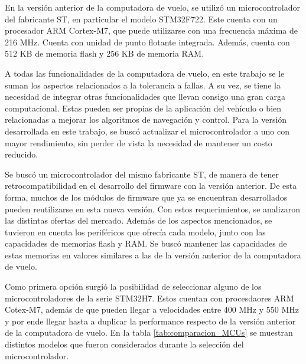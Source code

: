 En la versión anterior de la computadora de vuelo, se utilizó un microcontrolador del fabricante ST, en particular el modelo STM32F722. Este cuenta con un procesador ARM Cortex-M7, que puede utilizarse con una frecuencia máxima de 216 MHz. Cuenta con unidad de punto flotante integrada. Además, cuenta con 512 KB de memoria flash y 256 KB de memoria RAM.

A todas las funcionalidades de la computadora de vuelo, en este trabajo se le suman los aspectos relacionados a la tolerancia a fallas. A su vez, se tiene la necesidad de integrar otras funcionalidades que llevan consigo una gran carga computacional. Estas pueden ser propias de la aplicación del vehículo o bien relacionadas a mejorar los algoritmos de navegación y control. Para la versión desarrollada en este trabajo, se buscó actualizar el microcontrolador a uno con mayor rendimiento, sin perder de vista la necesidad de mantener un costo reducido.

Se buscó un microcontrolador del mismo fabricante ST, de manera de tener retrocompatibilidad en el desarrollo del firmware con la versión anterior. De esta forma, muchos de los módulos de firmware que ya se encuentran desarrollados pueden reutilizarse en esta nueva versión. Con estos requerimientos, se analizaron las distintas ofertas del mercado. Además de los aspectos mencionados, se tuvieron en cuenta los periféricos que ofrecía cada modelo, junto con las capacidades de memorias flash y RAM. Se buscó mantener las capacidades de estas memorias en valores similares a las de la versión anterior de la computadora de vuelo.

Como primera opción surgió la posibilidad de seleccionar alguno de los microcontroladores de la serie STM32H7. Estos cuentan con procesdaores ARM Cotex-M7, además de que pueden llegar a velocidades entre 400 MHz y 550 MHz \cite{AN5293} y por ende llegar hasta a duplicar la performance respecto de la versión anterior de la computadora de vuelo. En la tabla \ref{tab:comparacion_MCUs} se muestran distintos modelos que fueron considerados durante la selección del microcontrolador.

